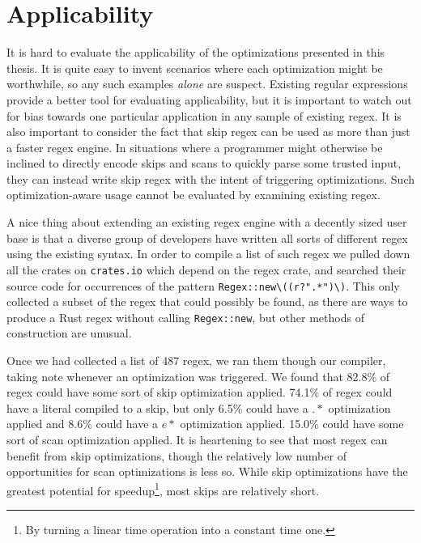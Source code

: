 \section{Applicability}
\label{section:applicability}

It is hard to evaluate the applicability of the optimizations presented
in this thesis. It is quite easy to invent scenarios where each
optimization might be worthwhile, so any such examples \emph{alone} are
suspect. Existing regular expressions provide a better tool for
evaluating applicability, but it is important to watch out for
bias towards one particular application in any sample of existing
regex. It is also important to consider the fact that skip regex
can be used as more than just a faster regex engine. In situations
where a programmer might otherwise be inclined to directly encode
skips and scans to quickly parse some trusted input, they can
instead write skip regex with the intent of triggering optimizations.
Such optimization-aware usage cannot be evaluated by examining
existing regex.

A nice thing about extending an existing regex engine
with a decently sized user base is that a diverse group of developers
have written all sorts of different regex using the existing syntax.
In order to compile a list of such regex we pulled down all the
crates on \verb'crates.io' which depend on the regex crate, and
searched their source code for occurrences of the pattern
\verb'Regex::new\((r?".*")\)'. This only collected a subset of
the regex that could possibly be found, as there are ways to
produce a Rust regex without calling \verb'Regex::new', but
other methods of construction are unusual.

Once we had collected
a list of 487 regex, we ran them though our compiler, taking
note whenever an optimization was triggered. We found that
82.8\% of regex could have some sort of skip optimization
applied. 74.1\% of regex could have a literal compiled to a skip,
but only 6.5\% could have a $.*$ optimization applied and 8.6\% could
have a $e*$ optimization applied. 15.0\% could have some sort of
scan optimization applied. It is heartening to see that most regex
can benefit from skip optimizations, though the relatively low number
of opportunities for scan optimizations is less so. While skip
optimizations have the greatest potential for speedup\footnote{By turning
a linear time operation into a constant time one.}, most skips
are relatively short.

